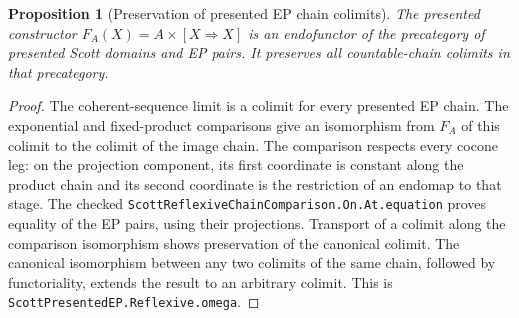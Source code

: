\documentclass[11pt,a4paper]{article}
\newtheorem{proposition}[theorem]{Proposition}
\theoremstyle{definition}
\theoremstyle{remark}
\newcommand{\Cont}[2]{[#1\mathbin{\Rightarrow}#2]}
\begin{document}
\begin{proposition}[Preservation of presented EP chain colimits]
\label{prop:presented-reflexive-preservation}
The presented constructor $F_A(X)=A\times\Cont{X}{X}$ is an endofunctor
of the precategory of presented Scott domains and EP pairs. It preserves
all countable-chain colimits in that precategory.
\end{proposition}
\begin{proof}
The coherent-sequence limit is a colimit for every presented EP chain.
The exponential and fixed-product comparisons give an isomorphism from
$F_A$ of this colimit to the colimit of the image chain. The comparison
respects every cocone leg: on the projection component, its first
coordinate is constant along the product chain and its second coordinate
is the restriction of an endomap to that stage. The checked
\texttt{ScottReflexiveChainComparison.On.At.equation} proves equality of
the EP pairs, using their projections. Transport of a colimit along the
comparison isomorphism shows preservation of the canonical colimit.
The canonical isomorphism between any two colimits of the same chain,
followed by functoriality, extends the result to an arbitrary colimit.
This is \texttt{ScottPresentedEP.Reflexive.omega}.
\end{proof}
\end{document}
